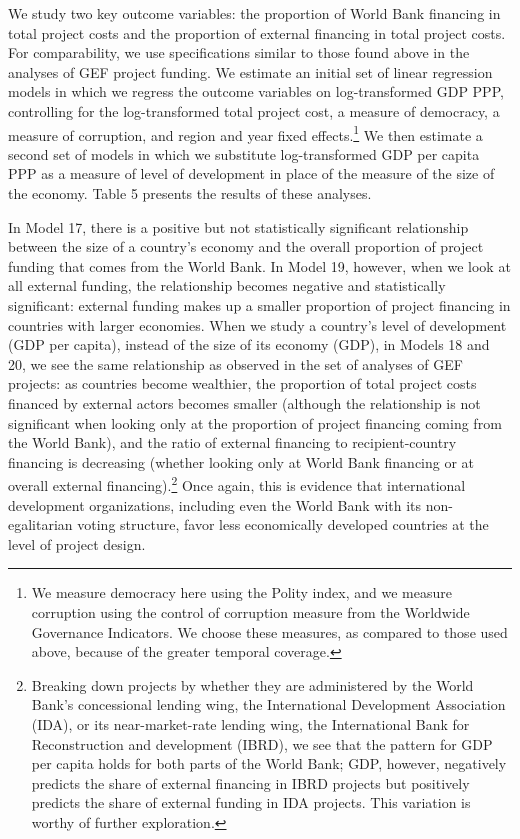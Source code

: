 \documentclass{article}
\begin{document}
We study two key outcome variables: the proportion of World Bank financing in total project costs and the proportion of external financing in total project costs. For comparability, we use specifications similar to those found above in the analyses of GEF project funding.  We estimate an initial set of linear regression models in which we regress the outcome variables on log-transformed GDP PPP, controlling for the log-transformed total project cost, a measure of democracy, a measure of corruption, and region and year fixed effects.\footnote{We measure democracy here using the Polity index, and we measure corruption using the control of corruption measure from the Worldwide Governance Indicators.  We choose these measures, as compared to those used above, because of the greater temporal coverage.}   We then estimate a second set of models in which we substitute log-transformed GDP per capita PPP as a measure of level of development in place of the measure of the size of the economy. Table 5 presents the results of these analyses. 

In Model 17, there is a positive but not statistically significant relationship between the size of a country’s economy and the overall proportion of project funding that comes from the World Bank.  In Model 19, however, when we look at all external funding, the relationship becomes negative and statistically significant: external funding makes up a smaller proportion of project financing in countries with larger economies. When we study a country’s level of development (GDP per capita), instead of the size of its economy (GDP), in Models 18 and 20, we see the same relationship as observed in the set of analyses of GEF projects: as countries become wealthier, the proportion of total project costs financed by external actors becomes smaller (although the relationship is not significant when looking only at the proportion of project financing coming from the World Bank), and the ratio of external financing to recipient-country financing is decreasing (whether looking only at World Bank financing or at overall external financing).\footnote{Breaking down projects by whether they are administered by the World Bank’s concessional lending wing, the International Development Association (IDA), or its near-market-rate lending wing, the International Bank for Reconstruction and development (IBRD), we see that the pattern for GDP per capita holds for both parts of the World Bank; GDP, however, negatively predicts the share of external financing in IBRD projects but positively predicts the share of external funding in IDA projects.  This variation is worthy of further exploration.}   Once again, this is evidence that international development organizations, including even the World Bank with its non-egalitarian voting structure, favor less economically developed countries at the level of project design.
\end{document}
